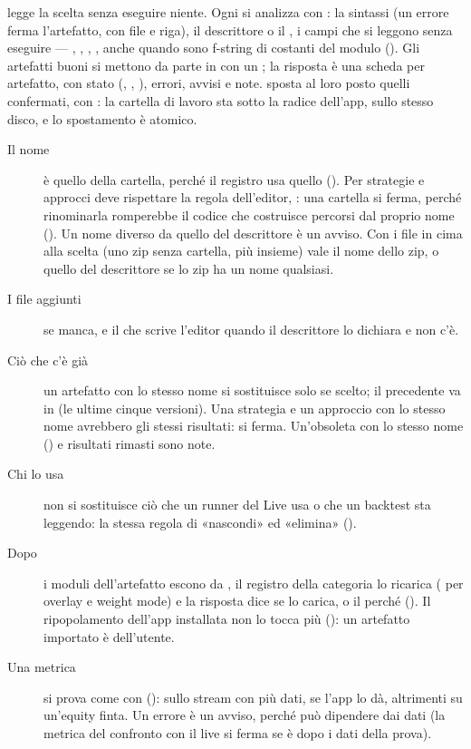  legge la scelta senza eseguire niente. Ogni  si
analizza con : la sintassi (un errore ferma l'artefatto, con file e
riga), il descrittore o il , i campi che si leggono senza eseguire
--- , , , ,
anche quando sono f-string di costanti del modulo
(). Gli artefatti buoni si
mettono da parte in  con un
; la risposta è una scheda per artefatto, con stato
(, , ), errori, avvisi e note.
 sposta al loro posto quelli confermati, con
: la cartella di lavoro sta sotto la radice dell'app, sullo
stesso disco, e lo spostamento è atomico.

\begin{description}
  \item[Il nome] è quello della cartella, perché il registro usa quello
    (). Per strategie e approcci deve rispettare la
    regola dell'editor, : una cartella
     si ferma, perché rinominarla romperebbe il codice che
    costruisce percorsi dal proprio nome (). Un nome
    diverso da quello del descrittore è un avviso. Con i file in cima alla
    scelta (uno zip senza cartella, più  insieme) vale il nome dello
    zip, o quello del descrittore se lo zip ha un nome qualsiasi.
  \item[I file aggiunti]  se manca, e il
     che scrive l'editor quando il descrittore lo
    dichiara e non c'è.
  \item[Ciò che c'è già] un artefatto con lo stesso nome si sostituisce solo
    se scelto; il precedente va in
     (le ultime
    cinque versioni). Una strategia e un approccio con lo stesso nome
    avrebbero gli stessi risultati: si ferma. Un'obsoleta con lo stesso nome
    () e risultati rimasti sono note.
  \item[Chi lo usa] non si sostituisce ciò che un runner del Live usa o che
    un backtest sta leggendo: la stessa regola di «nascondi» ed «elimina»
    ().
  \item[Dopo] i moduli dell'artefatto escono da , il
    registro della categoria lo ricarica ( per
    overlay e weight mode) e la risposta dice se lo carica, o il perché
    (). Il
    ripopolamento dell'app installata non lo tocca più
    (): un artefatto importato è dell'utente.
  \item[Una metrica] si prova come con 
    (): sullo stream con più dati, se l'app lo
    dà, altrimenti su un'equity finta. Un errore è un avviso, perché può
    dipendere dai dati (la metrica del confronto con il live si ferma se
     è dopo i dati della prova).
\end{description}

